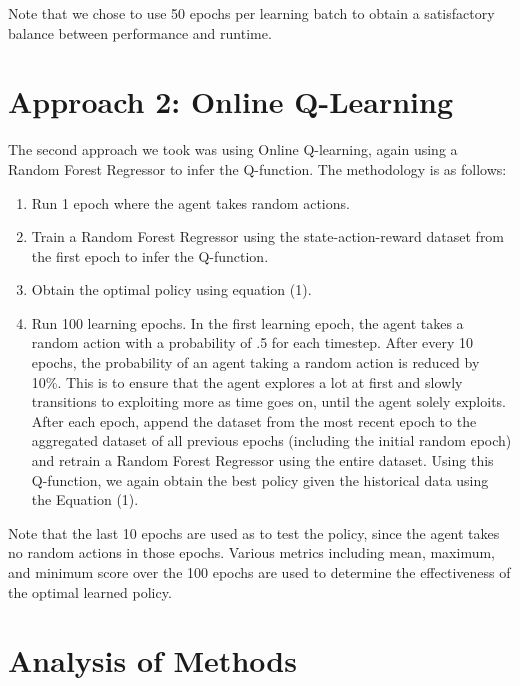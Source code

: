\documentclass[11pt, oneside]{article}   	%
\begin{document}
Note that we chose to use 50 epochs per learning batch to obtain a satisfactory balance between performance and runtime.
\section{Approach 2: Online Q-Learning}
The second approach we took was using Online Q-learning, again using a Random Forest Regressor to infer the Q-function.  The methodology is as follows:
\begin{enumerate}
  \item Run 1 epoch where the agent takes random actions.
  \item Train a Random Forest Regressor using the state-action-reward dataset from the first epoch to infer the Q-function.
  \item Obtain the optimal policy using equation (1).
  \item Run 100 learning epochs.  In the first learning epoch, the agent takes a random action with a probability of .5 for each timestep.  After every 10 epochs, the probability of an agent taking a random action is reduced by 10\%.  This is to ensure that the agent explores a lot at first and slowly transitions to exploiting more as time goes on, until the agent solely exploits.  After each epoch, append the dataset from the most recent epoch to the aggregated dataset of all previous epochs (including the initial random epoch) and retrain a Random Forest Regressor using the entire dataset.  Using this Q-function, we again obtain the best policy given the historical data using the Equation (1).
\end{enumerate}
Note that the last 10 epochs are used as to test the policy, since the agent takes no random actions in those epochs.  Various metrics including mean, maximum, and minimum score over the 100 epochs are used to determine the effectiveness of the optimal learned policy.
\section{Analysis of Methods}
\end{document}
